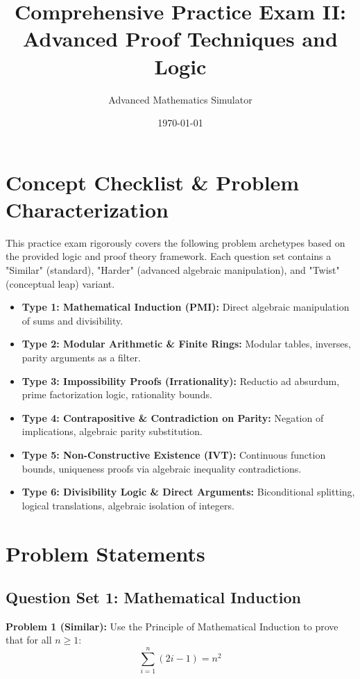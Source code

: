 \documentclass{article}
\title{Comprehensive Practice Exam II: Advanced Proof Techniques and Logic}
\author{Advanced Mathematics Simulator}
\date{\today}
\begin{document}
\maketitle
\tableofcontents
\newpage

\section{Concept Checklist \& Problem Characterization}
This practice exam rigorously covers the following problem archetypes based on the provided logic and proof theory framework. Each question set contains a "Similar" (standard), "Harder" (advanced algebraic manipulation), and "Twist" (conceptual leap) variant.
\begin{itemize}
    \item \textbf{Type 1: Mathematical Induction (PMI):} Direct algebraic manipulation of sums and divisibility.
    \item \textbf{Type 2: Modular Arithmetic \& Finite Rings:} Modular tables, inverses, parity arguments as a filter.
    \item \textbf{Type 3: Impossibility Proofs (Irrationality):} Reductio ad absurdum, prime factorization logic, rationality bounds.
    \item \textbf{Type 4: Contrapositive \& Contradiction on Parity:} Negation of implications, algebraic parity substitution.
    \item \textbf{Type 5: Non-Constructive Existence (IVT):} Continuous function bounds, uniqueness proofs via algebraic inequality contradictions.
    \item \textbf{Type 6: Divisibility Logic \& Direct Arguments:} Biconditional splitting, logical translations, algebraic isolation of integers.
\end{itemize}

\vspace{1cm}

\section{Problem Statements}

\subsection{Question Set 1: Mathematical Induction}
\noindent\textbf{Problem 1 (Similar):} Use the Principle of Mathematical Induction to prove that for all $n \ge 1$:
\[ \sum_{i=1}^n (2i - 1) = n^2 \]
\end{document}
